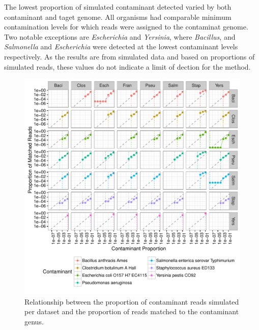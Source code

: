 \documentclass[fleqn,10pt,lineno]{wlpeerj}\usepackage[]{graphicx}\usepackage[]{color}
\makeatletter
\def\maxwidth{ %
  \ifdim\Gin@nat@width>\linewidth
    \linewidth
  \else
    \Gin@nat@width
  \fi
}
\newenvironment{knitrout}{}{} %
\makeatother
\begin{document}
The lowest proportion of simulated contaminant detected varied by both contaminant and taget genome. 
All organisms had comparable minimum contamination levels for which reads were assigned to the contaminat genome. 
Two notable exceptions are \textit{Escherichia} and \textit{Yersinia}, where \textit{Bacillus}, and \textit{Salmonella} and \textit{Escherichia} were detected at the lowest contaminant levels respectively. 
As the results are from simulated data and based on proportions of simulated reads, these values do not indicate a limit of dection for the method.

\begin{knitrout}
\color{fgcolor}\begin{figure}
\includegraphics[width=\maxwidth]{figure/contam_min-1} \caption[Relationship between the proportion of contaminant reads simulated per dataset and the proportion of reads matched to the contaminant genus]{Relationship between the proportion of contaminant reads simulated per dataset and the proportion of reads matched to the contaminant genus.}\label{fig:contam_min}
\end{figure}


\end{knitrout}
\end{document}
